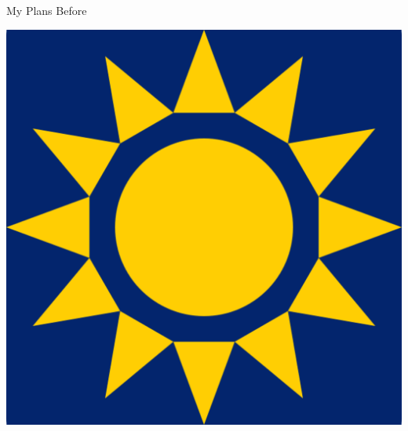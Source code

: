 \documentclass{beamer}
\begin{document}
\begin{frame}{My Plans Before}
\begin{center}
        \includegraphics[height=0.2\textheight]{static/pycon-namibia.png}

    \end{center}
\end{frame}
\end{document}

